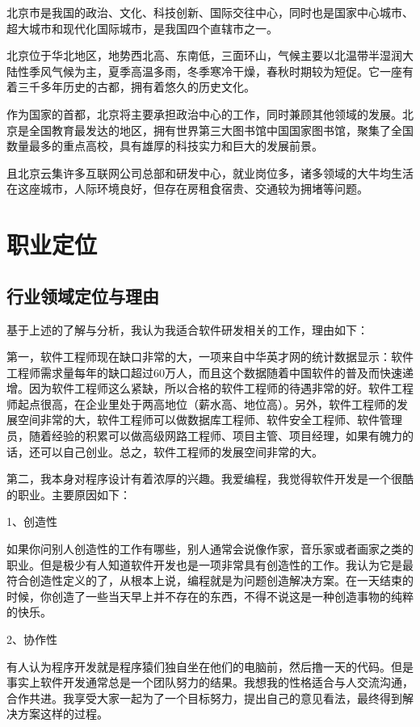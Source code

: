 \documentclass{article}
\begin{document}
北京市是我国的政治、文化、科技创新、国际交往中心，同时也是国家中心城市、超大城市和现代化国际城市，是我国四个直辖市之一。

北京位于华北地区，地势西北高、东南低，三面环山，气候主要以北温带半湿润大陆性季风气候为主，夏季高温多雨，冬季寒冷干燥，春秋时期较为短促。它一座有着三千多年历史的古都，拥有着悠久的历史文化。

作为国家的首都，北京将主要承担政治中心的工作，同时兼顾其他领域的发展。北京是全国教育最发达的地区，拥有世界第三大图书馆中国国家图书馆，聚集了全国数量最多的重点高校，具有雄厚的科技实力和巨大的发展前景。

且北京云集许多互联网公司总部和研发中心，就业岗位多，诸多领域的大牛均生活在这座城市，人际环境良好，但存在房租食宿贵、交通较为拥堵等问题。

\section{职业定位}

\subsection{行业领域定位与理由}

基于上述的了解与分析，我认为我适合软件研发相关的工作，理由如下：

第一，软件工程师现在缺口非常的大，一项来自中华英才网的统计数据显示：软件工程师需求量每年的缺口超过60万人，而且这个数据随着中国软件的普及而快速递增。因为软件工程师这么紧缺，所以合格的软件工程师的待遇非常的好。软件工程师起点很高，在企业里处于两高地位（薪水高、地位高）。另外，软件工程师的发展空间非常的大，软件工程师可以做数据库工程师、软件安全工程师、软件管理员，随着经验的积累可以做高级网路工程师、项目主管、项目经理，如果有魄力的话，还可以自己创业。总之，软件工程师的发展空间非常的大。

第二，我本身对程序设计有着浓厚的兴趣。我爱编程，我觉得软件开发是一个很酷的职业。主要原因如下：

1、创造性

如果你问别人创造性的工作有哪些，别人通常会说像作家，音乐家或者画家之类的职业。但是极少有人知道软件开发也是一项非常具有创造性的工作。我认为它是最符合创造性定义的了，从根本上说，编程就是为问题创造解决方案。在一天结束的时候，你创造了一些当天早上并不存在的东西，不得不说这是一种创造事物的纯粹的快乐。

2、协作性

有人认为程序开发就是程序猿们独自坐在他们的电脑前，然后撸一天的代码。但是事实上软件开发通常总是一个团队努力的结果。我想我的性格适合与人交流沟通，合作共进。我享受大家一起为了一个目标努力，提出自己的意见看法，最终得到解决方案这样的过程。
\end{document}
